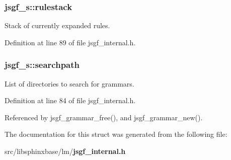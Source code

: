 \subsubsection[{rulestack}]{ jsgf\-\_\-s\-::rulestack}\label{structjsgf__s_a0980112df6f2f591e64158266eb04b69}


Stack of currently expanded rules. 



Definition at line 89 of file jsgf\-\_\-internal.\-h.

\subsubsection[{searchpath}]{ jsgf\-\_\-s\-::searchpath}\label{structjsgf__s_aabb207f0909c661a831e5f931dd9f60e}


List of directories to search for grammars. 



Definition at line 84 of file jsgf\-\_\-internal.\-h.



Referenced by jsgf\-\_\-grammar\-\_\-free(), and jsgf\-\_\-grammar\-\_\-new().



The documentation for this struct was generated from the following file\-:\begin{DoxyCompactItemize}
\item 
src/libsphinxbase/lm/{\bf jsgf\-\_\-internal.\-h}\end{DoxyCompactItemize}
